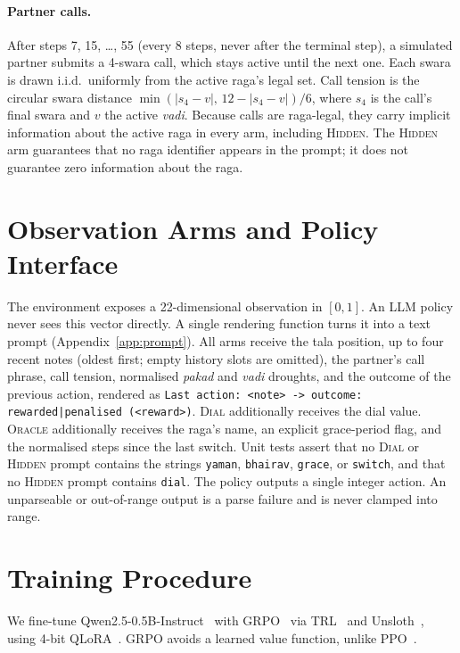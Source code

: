 \documentclass[11pt]{article}
\newcommand{\hidden}{\textsc{Hidden}}
\newcommand{\dial}{\textsc{Dial}}
\newcommand{\oracle}{\textsc{Oracle}}
\newcommand{\sw}[1]{\textit{#1}}  %
\begin{document}
\paragraph{Partner calls.} After steps 7, 15, \dots, 55 (every 8 steps, never after the terminal step), a simulated partner submits a 4-swara call, which stays active until the next one. Each swara is drawn i.i.d.\ uniformly from the active raga's legal set. Call tension is the circular swara distance $\min(|s_4 - v|,\,12-|s_4 - v|)/6$, where $s_4$ is the call's final swara and $v$ the active \sw{vadi}. Because calls are raga-legal, they carry implicit information about the active raga in every arm, including \hidden{}. The \hidden{} arm guarantees that no raga identifier appears in the prompt; it does not guarantee zero information about the raga.

\section{Observation Arms and Policy Interface}
\label{sec:arms}

The environment exposes a 22-dimensional observation in $[0,1]$. An LLM policy never sees this vector directly. A single rendering function turns it into a text prompt (Appendix~\ref{app:prompt}). All arms receive the tala position, up to four recent notes (oldest first; empty history slots are omitted), the partner's call phrase, call tension, normalised \sw{pakad} and \sw{vadi} droughts, and the outcome of the previous action, rendered as \texttt{Last action: <note> -> outcome: rewarded|penalised (<reward>)}. \dial{} additionally receives the dial value. \oracle{} additionally receives the raga's name, an explicit grace-period flag, and the normalised steps since the last switch. Unit tests assert that no \dial{} or \hidden{} prompt contains the strings \texttt{yaman}, \texttt{bhairav}, \texttt{grace}, or \texttt{switch}, and that no \hidden{} prompt contains \texttt{dial}. The policy outputs a single integer action. An unparseable or out-of-range output is a parse failure and is never clamped into range.

\section{Training Procedure}
\label{sec:training}

We fine-tune Qwen2.5-0.5B-Instruct~\citep{qwen2024qwen25} with GRPO~\citep{shao2024deepseekmath} via TRL~\citep{trl} and Unsloth~\citep{unsloth}, using 4-bit QLoRA~\citep{dettmers2023qlora,hu2021lora}. GRPO avoids a learned value function, unlike PPO~\citep{schulman2017ppo}.
\end{document}
